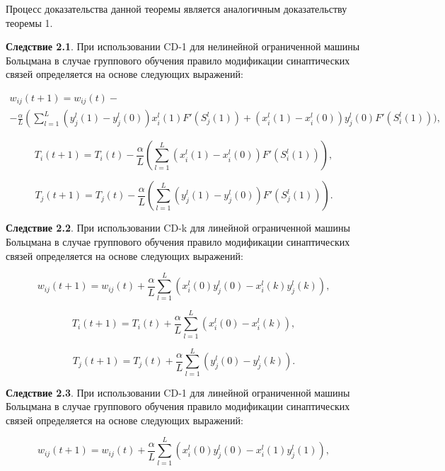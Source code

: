 Процесс доказательства данной теоремы является аналогичным доказательству теоремы 1.

\textbf{Следствие 2.1}. При использовании  CD-1 для нелинейной ограниченной машины Больцмана в случае группового обучения правило модификации синаптических связей определяется на основе следующих выражений:

\begin{multline*}
    w_{ij}(t+1)=w_{ij}(t)-\\-\frac{\alpha}{L}\left(\sum_{l=1}^L (y_j^l(1)-y_j^l(0))x_i^l(1)F'(S_j^l(1))+(x_i^l(1)-x_i^l(0))y_j^l(0)F'(S_i^l(1))\Bigg)\right.,
\end{multline*}

\begin{equation*}
    T_i(t+1)=T_i(t)-\frac{\alpha}{L}\left(\sum_{l=1}^L (x_i^l(1)-x_i^l(0))F'(S_i^l(1))\right),
\end{equation*}

\begin{equation*}
    T_j(t+1)=T_j(t)-\frac{\alpha}{L}\left(\sum_{l=1}^L (y_j^l(1)-y_j^l(0))F'(S_j^l(1))\right).
\end{equation*}

\textbf{Следствие 2.2}. При использовании  CD-k для линейной ограниченной машины Больцмана в случае группового обучения правило модификации синаптических связей определяется на основе следующих выражений:

\begin{equation*}
    w_{ij}(t+1)=w_{ij}(t)+\frac{\alpha}{L}\sum_{l=1}^L (x_i^l(0)y_j^l(0)-x_i^l(k)y_j^l(k)),
\end{equation*}

\begin{equation*}
    T_{i}(t+1)=T_{i}(t)+\frac{\alpha}{L}\sum_{l=1}^L (x_i^l(0)-x_i^l(k)),
\end{equation*}

\begin{equation*}
    T_{j}(t+1)=T_{j}(t)+\frac{\alpha}{L}\sum_{l=1}^L (y_j^l(0)-y_j^l(k)).
\end{equation*}

\textbf{Следствие 2.3}. При использовании  CD-1 для линейной ограниченной машины Больцмана в случае группового обучения правило модификации синаптических связей определяется на основе следующих выражений:

\begin{equation*}
    w_{ij}(t+1)=w_{ij}(t)+\frac{\alpha}{L}\sum_{l=1}^L (x_i^l(0)y_j^l(0)-x_i^l(1)y_j^l(1)),
\end{equation*}


